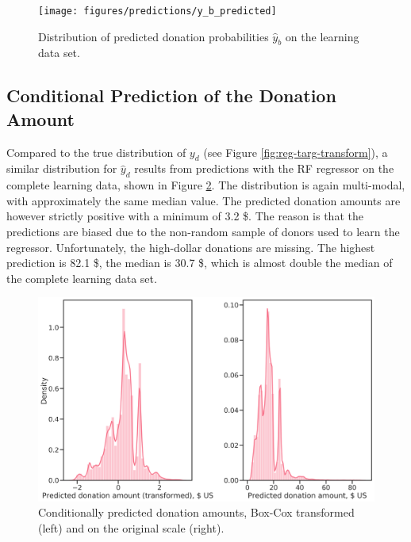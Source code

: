 \documentclass[
  11pt,
  a4paper,
  DIV=12,captions=tableheading,oneside,titlepage]{scrbook}
\begin{document}
\begin{figure}

{\centering \texttt{[image: figures/predictions/y\_b\_predicted]} 

}

\caption{Distribution of predicted donation probabilities \(\hat{y}_b\) on the learning data set.}\label{fig:y-b-predict}
\end{figure}

\hypertarget{conditional-prediction-of-the-donation-amount}{%
\subsection{Conditional Prediction of the Donation Amount}\label{conditional-prediction-of-the-donation-amount}}

Compared to the true distribution of \(y_d\) (see Figure \ref{fig:reg-targ-transform}), a similar distribution for \(\hat{y}_d\) results from predictions with the RF regressor on the complete learning data, shown in Figure \ref{fig:y-d-predict}. The distribution is again multi-modal, with approximately the same median value. The predicted donation amounts are however strictly positive with a minimum of 3.2 \$. The reason is that the predictions are biased due to the non-random sample of donors used to learn the regressor. Unfortunately, the high-dollar donations are missing. The highest prediction is 82.1 \$, the median is 30.7 \$, which is almost double the median of the complete learning data set.



\begin{figure}

{\centering \includegraphics[width=0.7\linewidth]{figures/predictions/hat_y_d-distributions-before-after-transformation} 

}

\caption{Conditionally predicted donation amounts, Box-Cox transformed (left) and on the original scale (right).}\label{fig:y-d-predict}
\end{figure}
\end{document}
